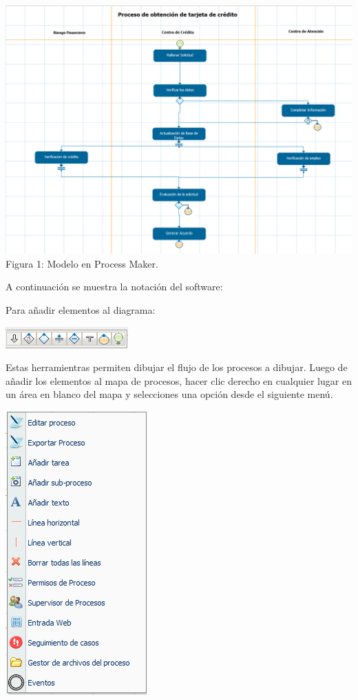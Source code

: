 \begin{center}
\includegraphics[scale=0.5]{./imagenes/modelos_pm.png}\\
     Figura 1: Modelo en Process Maker.\\
\end{center}

A continuación se muestra la notación del software:

Para añadir elementos al diagrama:

\includegraphics[scale=0.8]{./imagenes/menu.png}

Estas herramientras permiten dibujar el flujo de los procesos a dibujar.
Luego de añadir los elementos al mapa de procesos, hacer clic derecho en cualquier lugar en un área en blanco del mapa y selecciones una opción desde el siguiente menú.

\includegraphics[scale=0.8]{./imagenes/clickmenu.png}

